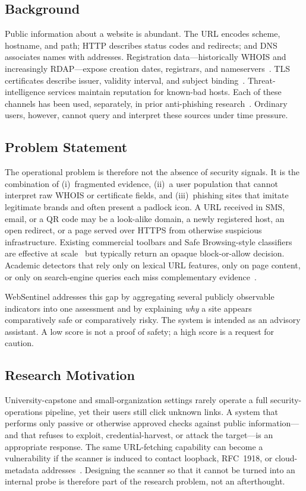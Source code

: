 \documentclass[conference]{IEEEtran}
\begin{document}
\subsection{Background}
Public information about a website is abundant. The URL encodes scheme, hostname, and path; HTTP describes status codes and redirects; and DNS associates names with addresses. Registration data---historically WHOIS and increasingly RDAP---expose creation dates, registrars, and nameservers~\cite{rfc7480}. TLS certificates describe issuer, validity interval, and subject binding~\cite{rfc8446}. Threat-intelligence services maintain reputation for known-bad hosts. Each of these channels has been used, separately, in prior anti-phishing research~\cite{zhang2007cantina,ma2009beyond,xiang2011cantinaplus,rao2019detection}. Ordinary users, however, cannot query and interpret these sources under time pressure.

\subsection{Problem Statement}
The operational problem is therefore not the absence of security signals. It is the combination of (i)~fragmented evidence, (ii)~a user population that cannot interpret raw WHOIS or certificate fields, and (iii)~phishing sites that imitate legitimate brands and often present a padlock icon. A URL received in SMS, email, or a QR code may be a look-alike domain, a newly registered host, an open redirect, or a page served over HTTPS from otherwise suspicious infrastructure. Existing commercial toolbars and Safe Browsing-style classifiers are effective at scale~\cite{whittaker2010large} but typically return an opaque block-or-allow decision. Academic detectors that rely only on lexical URL features, only on page content, or only on search-engine queries each miss complementary evidence~\cite{sahingoz2019ml,hannousse2021benchmark}.

WebSentinel addresses this gap by aggregating several publicly observable indicators into one assessment and by explaining \emph{why} a site appears comparatively safe or comparatively risky. The system is intended as an advisory assistant. A low score is not a proof of safety; a high score is a request for caution.

\subsection{Research Motivation}
University-capstone and small-organization settings rarely operate a full security-operations pipeline, yet their users still click unknown links. A system that performs only passive or otherwise approved checks against public information---and that refuses to exploit, credential-harvest, or attack the target---is an appropriate response. The same URL-fetching capability can become a vulnerability if the scanner is induced to contact loopback, RFC~1918, or cloud-metadata addresses~\cite{rfc1918,owaspssrf}. Designing the scanner so that it cannot be turned into an internal probe is therefore part of the research problem, not an afterthought.
\end{document}
